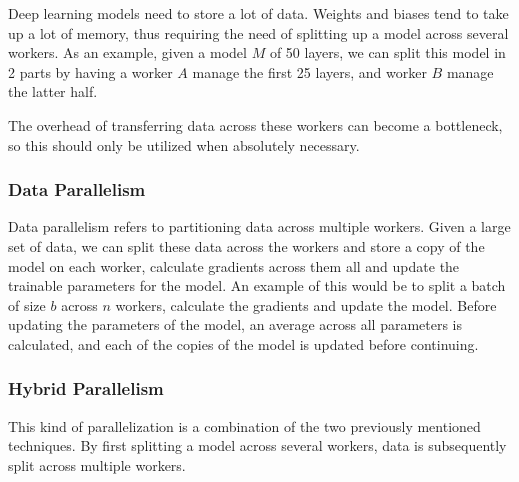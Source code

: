 Deep learning models need to store a lot of data. Weights and biases tend to take up a lot of memory, thus requiring the need of splitting up a model across several workers. As an example, given a model $M$ of 50 layers, we can split this model in 2 parts by having a worker $A$ manage the first 25 layers, and worker $B$ manage the latter half.

The overhead of transferring data across these workers can become a bottleneck, so this should only be utilized when absolutely necessary.

\subsubsection{Data Parallelism}

Data parallelism refers to partitioning data across multiple workers.  Given a large set of data, we can split these data across the workers and store a copy of the model on each worker, calculate gradients across them all and update the trainable parameters for the model. An example of this would be to split a batch of size $b$ across $n$ workers, calculate the gradients and update the model. Before updating the parameters of the model, an average across all parameters is calculated, and each of the copies of the model is updated before continuing.

\subsubsection{Hybrid Parallelism}

This kind of parallelization is a combination of the two previously mentioned techniques. By first splitting a model across several workers, data is subsequently split across multiple workers. 


